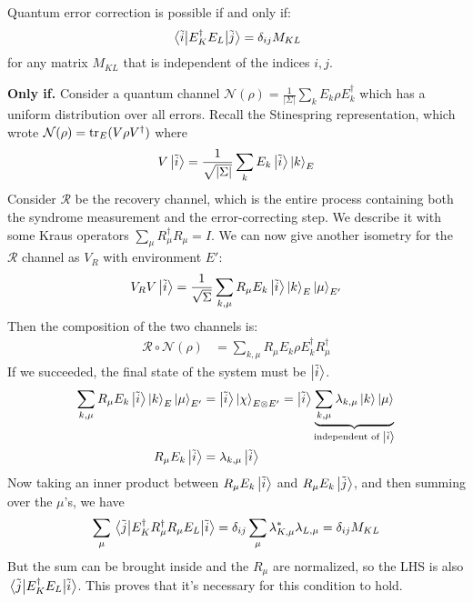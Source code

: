 \begin{theorem}
    Quantum error correction is possible if and only if:
    \[ \mel{\tilde{i}}{E_K^{\dagger} E_L}{\tilde{j}} = \delta_{ij} M_{KL} \]
    for any matrix $M_{KL}$ that is independent of the indices $i, j$.

    \begin{proof*}
        \textbf{Only if.}
        Consider a quantum channel $\mathcal{N}(\rho) = \frac{1}{|\Sigma|} \sum_k E_k \rho E_k^{\dagger}$
        which has a uniform distribution over all errors. Recall the Stinespring representation,
        which wrote $\mathcal{N}(\rho) = \tr_E(V \rho V^{\dagger})$ where
        \[ V \ket{\tilde{i}} = \frac{1}{\sqrt{|\Sigma|}} \sum_k E_k \ket{\tilde{i}} \ket{k}_E \]
        Consider $\mathcal{R}$ be the recovery channel, which is the entire process containing both the syndrome measurement and the
        error-correcting step. We describe it with some Kraus operators $\sum_\mu R_{\mu}^{\dagger} R_{\mu} = I$.
        We can now give another isometry for the $\mathcal{R}$ channel as $V_R$ with environment $E'$:
        \[ V_R V \ket{\tilde{i}} = \frac{1}{\sqrt{\Sigma}} \sum_{k, \mu} R_\mu E_k \ket{\tilde{i}} \ket{k}_E \ket{\mu}_{E'}\]
        Then the composition of the two channels is:
        \begin{align*}
            \mathcal{R} \circ \mathcal{N}(\rho) &= \sum_{k, \mu} R_{\mu} E_k \rho E_k^{\dagger} R_{\mu}^{\dagger}
        \end{align*}
        If we succeeded, the final state of the system must be $\ket{\tilde{i}}$.
        \begin{align*}
            \sum_{k, \mu} R_\mu E_k \ket{\tilde{i}} \ket{k}_E \ket{\mu}_{E'} &= \ket{\tilde{i}} \ket{\chi}_{E \otimes E'}
            = \ket{\tilde{i}} \underbrace{\sum_{k, \mu} \lambda_{k, \mu} \ket{k} \ket{\mu}}_{\text{independent of }\ket{\tilde{i}}} \\
            R_{\mu} E_k \ket{\tilde{i}} &= \lambda_{k, \mu} \ket{\tilde{i}} 
        \end{align*}
        Now taking an inner product between $R_\mu E_k \ket{\tilde{i}}$ and $R_\mu E_k \ket{\tilde{j}}$, and then summing over the $\mu$'s, we have
        \[ \sum_{\mu} \mel{\tilde{j}}{E_K^{\dagger} R_{\mu}^{\dagger} R_{\mu} E_L}{\tilde{i}} = \delta_{ij} \sum_{\mu} \lambda_{K, \mu}^* \lambda_{L,\mu}  = \delta_{ij} M_{KL}\]
        But the sum can be brought inside and the $R_{\mu}$ are normalized, so the LHS is also $\mel{\tilde{j}}{E_K^{\dagger} E_L}{\tilde{i}}$.
        This proves that it's necessary for this condition to hold.\\
        

\end{proof*}
\end{theorem}
